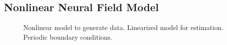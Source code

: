 \documentclass[conference,onecolumn]{IEEEtran}
\begin{document}
\subsection{Nonlinear Neural Field Model}

\begin{figure}[htbp]
	\centering
	\caption{Nonlinear model to generate data. Linearized model for estimation. Periodic boundary conditions.}
	\label{fig:label}
\end{figure}
\newpage
\end{document}
